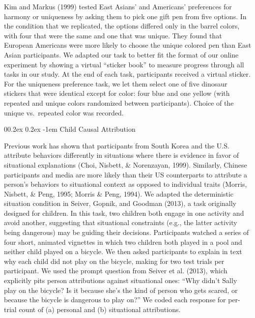 \documentclass[
  man,floatsintext]{apa6}
\makeatletter
\let\oldparagraph\paragraph
\renewcommand{\paragraph}[1]{\oldparagraph{#1}\mbox{}}
\renewcommand{\paragraph}{\@startsection{paragraph}{4}{\parindent}%
  {0\baselineskip \@plus 0.2ex \@minus 0.2ex}%
  {-1em}%
  {\normalfont\normalsize\bfseries\itshape\typesectitle}}
\makeatother
\begin{document}
Kim and Markus (1999) tested East Asians' and Americans' preferences for harmony or uniqueness by asking them to pick one gift pen from five options. In the condition that we replicated, the options differed only in the barrel colors, with four that were the same and one that was unique. They found that European Americans were more likely to choose the unique colored pen than East Asian participants. We adapted our task to better fit the format of our online experiment by showing a virtual ``sticker book'' to measure progress through all tasks in our study. At the end of each task, participants received a virtual sticker. For the uniqueness preference task, we let them select one of five dinosaur stickers that were identical except for color: four blue and one yellow (with repeated and unique colors randomized between participants). Choice of the unique vs.~repeated color was recorded.

\hypertarget{child-causal-attribution}{%
\paragraph{Child Causal Attribution}\label{child-causal-attribution}}

Previous work has shown that participants from South Korea and the U.S. attribute behaviors differently in situations where there is evidence in favor of situational explanations (Choi, Nisbett, \& Norenzayan, 1999). Similarly, Chinese participants and media are more likely than their US counterparts to attribute a person's behaviors to situational context as opposed to individual traits (Morris, Nisbett, \& Peng, 1995; Morris \& Peng, 1994). We adapted the deterministic situation condition in Seiver, Gopnik, and Goodman (2013), a task originally designed for children. In this task, two children both engage in one activity and avoid another, suggesting that situational constraints (e.g., the latter activity being dangerous) may be guiding their decisions. Participants watched a series of four short, animated vignettes in which two children both played in a pool and neither child played on a bicycle. We then asked participants to explain in text why each child did not play on the bicycle, making for two test trials per participant. We used the prompt question from Seiver et al. (2013), which explicitly pits person attributions against situational ones: ``Why didn't Sally play on the bicycle? Is it because she's the kind of person who gets scared, or because the bicycle is dangerous to play on?'' We coded each response for per-trial count of (a) personal and (b) situational attributions.
\end{document}
